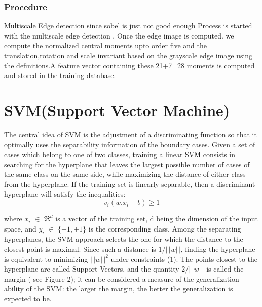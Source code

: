 \subsubsection {Procedure}
Multiscale Edge detection since sobel is just not good enough
Process is started with the multiscale edge detection . Once the edge image is
computed. we compute the normalized central moments upto order five and the translation,rotation and scale invariant based on the grayscale edge image using the definitions.A feature vector containing these 21+7=28 moments is computed and stored in the training database.\cite{Wang97}

\section {SVM(Support Vector Machine)}
The  central  idea  of SVM  is  the  adjustment  of  a  discriminating  function  so  that  it  optimally  uses  the  separability information of the boundary cases. Given a set of cases which belong  to one of  two classes,  training a  linear SVM consists  in  searching  for  the hyperplane  that  leaves  the  largest possible number of  cases  of  the  same  class  on  the same side, while maximizing the distance of either class from the hyperplane. If the training set is linearly separable, then a discriminant hyperplane will satisfy the inequalities:
\begin{equation}
v_{i}(w.x_{i}+b) \geq 1
\end{equation}

 where $x_{i}$  $\in$  $\Re^d$ is a  vector  of  the  training  set,  d  being  the  dimension  of  the  input  space,  and $y_{i}$  $\in$ ${\{-1,+1\}}$ is  the corresponding class. Among the separating hyperplanes, the SVM approach selects the one for which the distance to the closest point is maximal. Since  such a distance  is  $1/|\,|w|\,|$,  finding  the  hyperplane  is  equivalent  to minimizing $|\,|w|\,|^2$   under constraints (1). 
 The points closest to the hyperplane are called Support Vectors, and the quantity   $2/|\,|w|\,|$  is called  the margin  (  see Figure 2);  it can be considered a measure of  the generalization ability of  the SVM:  the larger the margin, the better the generalization is expected to be.

